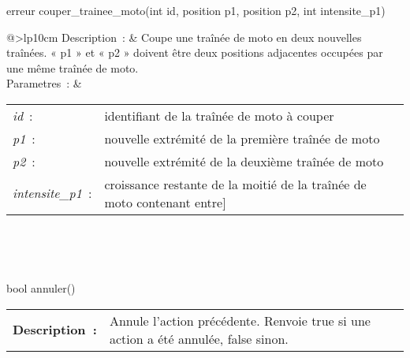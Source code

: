 \begin{minipage}{\linewidth}

\begin{lst-c++}
erreur couper_trainee_moto(int id, position p1, position p2, int intensite_p1)
\end{lst-c++}

\noindent
\begin{tabular}[t]{@{\extracolsep{0pt}}>{\bfseries}lp{10cm}}
Description~: & Coupe une traînée de moto en deux nouvelles traînées. « p1 » et « p2 » doivent être deux positions adjacentes occupées par une même traînée de moto. \\


Parametres~: &
\begin{tabular}[t]{@{\extracolsep{0pt}}ll}
    
    
      
        \textsl{id}~: & identifiant de la traînée de moto à couper \\
      
    
      
        \textsl{p1}~: & nouvelle extrémité de la première traînée de moto \\
      
    
      
        \textsl{p2}~: & nouvelle extrémité de la deuxième traînée de moto \\
      
    
      
        \textsl{intensite\_p1}~: & croissance restante de la moitié de la traînée de moto contenant entre] \\
      
    
  \end{tabular} \\






\end{tabular} \\[0.3cm]
\end{minipage}


\begin{minipage}{\linewidth}

\begin{lst-c++}
bool annuler()
\end{lst-c++}

\noindent
\begin{tabular}[t]{@{\extracolsep{0pt}}>{\bfseries}lp{10cm}}
Description~: & Annule l'action précédente. Renvoie true si une action a été annulée, false sinon. \\







\end{tabular} \\[0.3cm]
\end{minipage}



